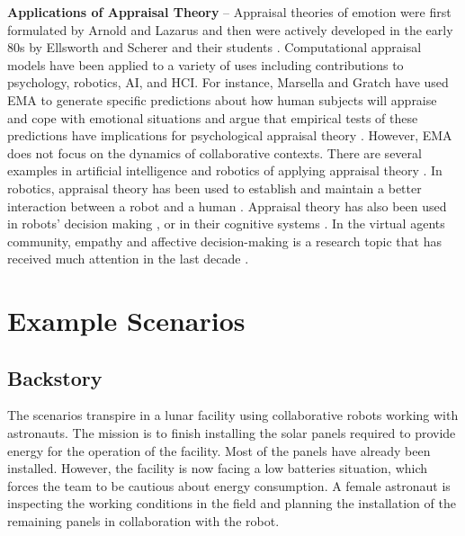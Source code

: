 \textbf{Applications of Appraisal Theory} -- Appraisal theories of emotion were
first formulated by Arnold \cite{arnold:emotion-personality} and Lazarus
\cite{lazarus:emotion-adaptation} and then were actively developed in the early
80s by Ellsworth and Scherer and their students
\cite{roseman:appraisal-theory,sander:systems-approach-appraisal,scherer:nature-function-emotion,scherer:emotions-emergent,scherer:appraisal-processes}.
Computational appraisal models have been applied to a variety of uses including
contributions to psychology, robotics, AI, and HCI. For instance, Marsella and
Gratch have used EMA \cite{marsella:ema-process-model} to generate specific
predictions about how human subjects will appraise and cope with emotional
situations and argue that empirical tests of these predictions have implications
for psychological appraisal theory \cite{gratch:assessing-appraisal}. However,
EMA does not focus on the dynamics of collaborative contexts. There are several
examples in artificial intelligence and robotics of applying appraisal theory
\cite{adam:bdi-emotional-companion,kim:model-hri-appraisal,marsella:ema-process-model}.
In robotics, appraisal theory has been used to establish and maintain a better
interaction between a robot and a human
\cite{kim:model-hri-appraisal,sander:systems-approach-appraisal,vogiatzis:robot-museum}.
Appraisal theory has also been used in robots' decision making
\cite{castro:autonomous-robot-fear}, or in their cognitive systems
\cite{hudlicka:emotinos-reasons,marinier:emotion-reinforcement}. In the virtual
agents community, empathy and affective decision-making is a research topic that
has received much attention in the last decade
\cite{scott:modeling-empathy-agent,paiva:agent-care,pontier:women-robot-men,velasquez:emotions-motivations-agents}.

\section{Example Scenarios}
\label{sec:example-scenario}

\subsection{Backstory}

The scenarios transpire in a lunar facility using collaborative robots working
with astronauts. The mission is to finish installing the solar panels required
to provide energy for the operation of the facility. Most of the panels have
already been installed. However, the facility is now facing a low batteries
situation, which forces the team to be cautious about energy consumption. A
female astronaut is inspecting the working conditions in the field and planning
the installation of the remaining panels in collaboration with the robot.

